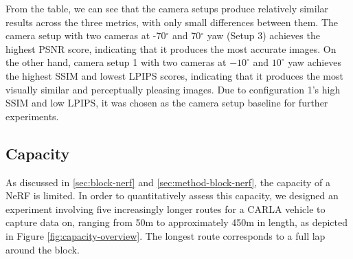From the table, we can see that the camera setups produce relatively similar results across the three metrics, with only small differences between them. The camera setup with two cameras at -70$^{\circ}$ and 70$^{\circ}$ yaw (Setup 3) achieves the highest PSNR score, indicating that it produces the most accurate images. On the other hand, camera setup 1 with two cameras at $-10^{\circ}$ and $10^{\circ}$ yaw achieves the highest SSIM and lowest LPIPS scores, indicating that it produces the most visually similar and perceptually pleasing images. Due to configuration 1's high SSIM and low LPIPS, it was chosen as the camera setup baseline for further experiments.












\subsection{Capacity} \label{sec:exp-capacity}
As discussed in \autoref{sec:block-nerf} and \autoref{sec:method-block-nerf}, the capacity of a NeRF is limited. In order to quantitatively assess this capacity, we designed an experiment involving five increasingly longer routes for a CARLA vehicle to capture data on, ranging from 50m to approximately 450m in length, as depicted in Figure \ref{fig:capacity-overview}. The longest route corresponds to a full lap around the block.


